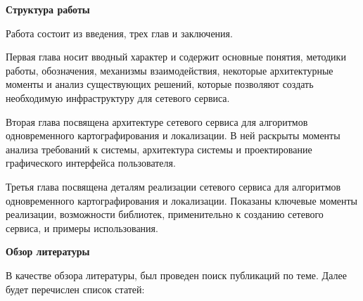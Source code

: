 \documentclass[a4paper, 14pt]{extreport}
\begin{document}
\vspace{2mm}
\par\noindent\textbf{Структура работы}
\vspace{2mm}
\par Работа состоит из введения, трех глав и заключения.
\par Первая глава носит вводный характер и содержит основные понятия, методики работы, обозначения, механизмы взаимодействия, 
некоторые архитектурные моменты и анализ 
существующих решений, которые позволяют создать необходимую инфраструктуру для сетевого сервиса.
\par Вторая глава посвящена архитектуре сетевого сервиса для алгоритмов одновременного картографирования и локализации. В ней раскрыты
моменты анализа требований к системы, архитектура системы и проектирование графического интерфейса пользователя.
\par Третья глава посвящена деталям реализации сетевого сервиса для алгоритмов одновременного картографирования и локализации. Показаны
ключевые моменты реализации, возможности библиотек, применительно к созданию сетевого сервиса, и примеры использования.
\vspace{2mm}
\par\noindent\textbf{Обзор литературы}
\vspace{2mm}
\par В качестве обзора литературы, был проведен поиск публикаций по теме. Далее будет перечислен список статей:
\end{document}
